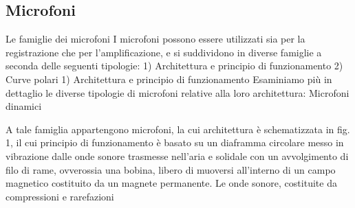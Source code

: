 

\subsection{Microfoni}

Le famiglie dei microfoni
I microfoni possono essere utilizzati sia per la registrazione che per l’amplificazione, e si suddividono in diverse famiglie a seconda delle seguenti tipologie:
1) Architettura e principio di funzionamento
2) Curve polari
1) Architettura e principio di funzionamento
Esaminiamo più in dettaglio le diverse tipologie di microfoni relative alla loro architettura:
Microfoni dinamici


A tale famiglia appartengono microfoni, la cui architettura è schematizzata in fig. 1, il cui principio di funzionamento è basato su un diaframma circolare messo in vibrazione dalle onde sonore trasmesse nell’aria e solidale con un avvolgimento di filo di rame, ovverossia una bobina, libero di muoversi all’interno di un campo magnetico costituito da un magnete permanente. Le onde sonore, costituite da compressioni e rarefazioni

